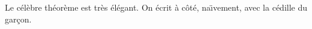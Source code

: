 \hsize=380pt\baselineskip=15pt Le c\'el\`ebre th\'eor\`eme est tr\`es \'el\'egant. On \'ecrit \`a c\^ot\'e, na\"\i vement, avec la c\'edille du gar\c con.\par
